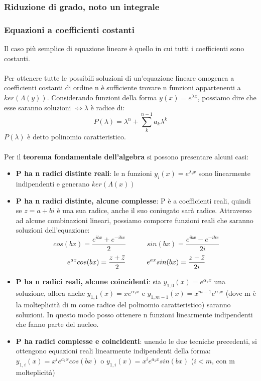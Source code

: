 \documentclass{article}
\begin{document}
\subsubsection{Riduzione di grado, noto un integrale}


\subsubsection{Equazioni a coefficienti costanti}
Il caso più semplice di equazione lineare è quello in cui tutti i coefficienti sono costanti.\\\\
Per ottenere tutte le possibili soluzioni di un'equazione lineare omogenea a coefficienti costanti di ordine n è sufficiente trovare n funzioni appartenenti a $ker(\Lambda(y))$. Considerando funzioni della forma $y(x)=e^{\lambda x}$, possiamo dire che esse saranno soluzioni $\Leftrightarrow\lambda$ è radice di:
$$ P(\lambda)=\lambda^n+\sum_k^{n-1}a_k\lambda^k $$
$P(\lambda)$ è detto polinomio caratteristico.\\\\
Per il \textbf{teorema fondamentale dell'algebra} si possono presentare alcuni casi:
\begin{itemize}
    \item \textbf{P ha n radici distinte reali}: le n funzioni $y_i(x)=e^{\lambda_ix}$ sono linearmente indipendenti e generano $ker(\Lambda(x))$
    
    \item \textbf{P ha n radici distinte, alcune complesse}: P è a coefficienti reali, quindi se $z=a+bi$ è una sua radice, anche il suo coniugato sarà radice. Attraverso ad alcune combinazioni lineari, possiamo comporre funzioni reali che saranno soluzioni dell'equazione:
    $$ cos(bx)=\frac{e^{ibx}+e^{-ibx}}{2} \quad\quad\quad sin(bx)=\frac{e^{ibx}-e^{-ibx}}{2i} $$
    $$ e^{ax}cos(bx)=\frac{z+\Bar{z}}{2} \quad\quad\quad e^{ax}sin(bx)=\frac{z-\Bar{z}}{2i} $$
    
    \item \textbf{P ha n radici reali, alcune coincidenti}: sia $y_{1,0}(x)=e^{\alpha_1x}$ una soluzione, allora anche $y_{1,1}(x)=xe^{\alpha_1x}$ e $y_{1,m-1}(x)=x^{m-1}e^{\alpha_1x}$ (dove m è la molteplicità di m come radice del polinomio caratteristico) saranno soluzioni. In questo modo posso ottenere n funzioni linearmente indipendenti che fanno parte del nucleo.
    
    \item \textbf{P ha radici complesse e coincidenti}: unendo le due tecniche precedenti, si ottengono equazioni reali linearmente indipendenti della forma: $y_{1,i}(x)=x^ie^{a_1x}cos(bx)$ o $y_{1,i}(x)=x^ie^{a_1x}sin(bx)$ ($i<m$, con m molteplicità)
\end{itemize}
\end{document}
